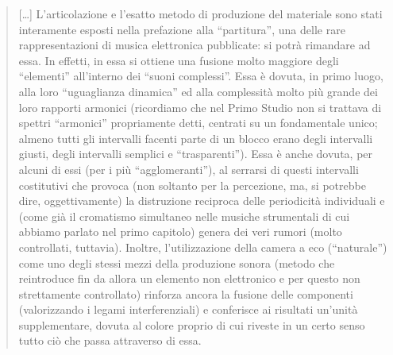 \begin{quote}
	[\ldots] L’articolazione e l’esatto metodo di produzione del materiale sono stati interamente esposti nella prefazione alla “partitura”, una delle rare rappresentazioni di musica elettronica pubblicate: si potrà rimandare ad essa. In effetti, in essa si ottiene una fusione molto maggiore degli “elementi” all’interno dei “suoni complessi”. Essa è dovuta, in primo luogo, alla loro “uguaglianza dinamica” ed alla complessità molto più grande dei loro rapporti armonici (ricordiamo che nel Primo Studio non si trattava di spettri “armonici” propriamente detti, centrati su un fondamentale unico; almeno tutti gli intervalli facenti parte di un blocco erano degli intervalli giusti, degli intervalli semplici e “trasparenti”). Essa è anche dovuta, per alcuni di essi (per i più “agglomeranti”), al serrarsi di questi intervalli costitutivi che provoca (non soltanto per la percezione, ma, si potrebbe dire, oggettivamente) la distruzione reciproca delle periodicità individuali e (come già il cromatismo simultaneo nelle musiche strumentali di cui abbiamo parlato nel primo capitolo) genera dei veri rumori (molto controllati, tuttavia). Inoltre, l’utilizzazione della camera a eco (“naturale”) come uno degli stessi mezzi della produzione sonora (metodo che reintroduce fin da allora un elemento non elettronico e per questo non strettamente controllato) rinforza ancora la fusione delle componenti (valorizzando i legami interferenziali) e conferisce ai risultati un’unità supplementare, dovuta al colore proprio di cui riveste in un certo senso tutto ciò che passa attraverso di essa.


\end{quote}
